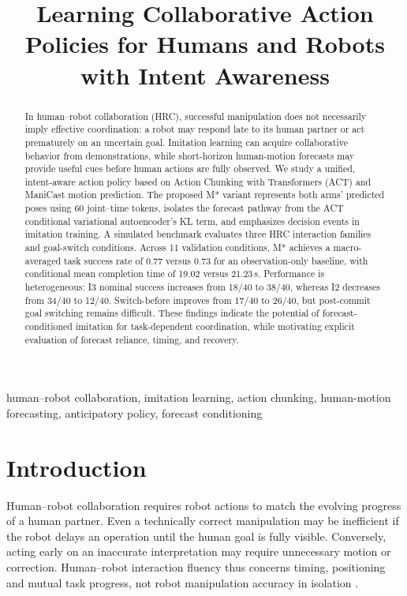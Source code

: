 \documentclass[conference]{IEEEtran}
\begin{document}
\title{Learning Collaborative Action Policies for Humans and Robots with Intent Awareness}
\author{
}
\maketitle

\begin{abstract}
In human--robot collaboration (HRC), successful manipulation does not necessarily imply effective coordination: a robot may respond late to its human partner or act prematurely on an uncertain goal. Imitation learning can acquire collaborative behavior from demonstrations, while short-horizon human-motion forecasts may provide useful cues before human actions are fully observed. We study a unified, intent-aware action policy based on Action Chunking with Transformers (ACT) and ManiCast motion prediction. The proposed M* variant represents both arms' predicted poses using 60 joint--time tokens, isolates the forecast pathway from the ACT conditional variational autoencoder's KL term, and emphasizes decision events in imitation training. A simulated benchmark evaluates three HRC interaction families and goal-switch conditions. Across 11 validation conditions, M* achieves a macro-averaged task success rate of 0.77 versus 0.73 for an observation-only baseline, with conditional mean completion time of 19.02 versus 21.23\,s. Performance is heterogeneous: I3 nominal success increases from 18/40 to 38/40, whereas I2 decreases from 34/40 to 12/40. Switch-before improves from 17/40 to 26/40, but post-commit goal switching remains difficult. These findings indicate the potential of forecast-conditioned imitation for task-dependent coordination, while motivating explicit evaluation of forecast reliance, timing, and recovery.

\end{abstract}

\begin{IEEEkeywords}
human--robot collaboration, imitation learning, action chunking, human-motion forecasting, anticipatory policy, forecast conditioning
\end{IEEEkeywords}

\section{Introduction}
Human--robot collaboration requires robot actions to match the evolving progress of a human partner. Even a technically correct manipulation may be inefficient if the robot delays an operation until the human goal is fully visible. Conversely, acting early on an inaccurate interpretation may require unnecessary motion or correction. Human--robot interaction fluency thus concerns timing, positioning and mutual task progress, not robot manipulation accuracy in isolation \cite{sebanz2006,hoffman2007,hoffman2019}.
\end{document}
